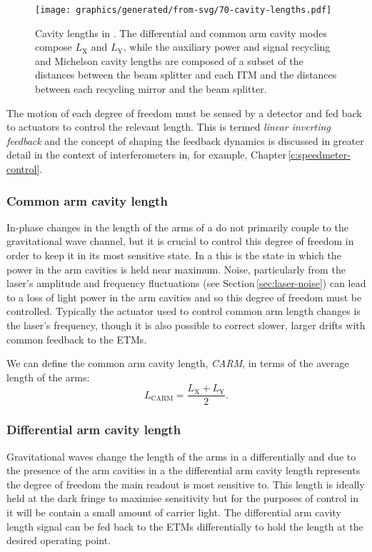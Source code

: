 \begin{figure}
  \centering
  \texttt{[image: graphics/generated/from-svg/70-cavity-lengths.pdf]}
  \caption[Cavity lengths in \ETLF{}]{\label{fig:et-lf-cavity-lengths}Cavity lengths in \ETLF{}. The differential and common arm cavity modes compose $L_{\text{X}}$ and $L_{\text{Y}}$, while the auxiliary power and signal recycling and Michelson cavity lengths are composed of a subset of the distances between the beam splitter and each \gls{ITM} and the distances between each recycling mirror and the beam splitter.}
\end{figure}

The motion of each degree of freedom must be sensed by a detector and fed back to actuators to control the relevant length. This is termed \emph{linear inverting feedback} and the concept of shaping the feedback dynamics is discussed in greater detail in the context of interferometers in, for example, Chapter\,\ref{c:speedmeter-control}.

\subsubsection{Common arm cavity length}
In-phase changes in the length of the arms of a \MI{} do not primarily couple to the gravitational wave channel, but it is crucial to control this degree of freedom in order to keep it in its most sensitive state. In a \DRFPMI{} this is the state in which the power in the arm cavities is held near maximum. Noise, particularly from the laser's amplitude and frequency fluctuations (see Section\,\ref{sec:laser-noise}) can lead to a loss of light power in the arm cavities and so this degree of freedom must be controlled. Typically the actuator used to control common arm length changes is the laser's frequency, though it is also possible to correct slower, larger drifts with common feedback to the \glspl{ETM}.

We can define the common arm cavity length, \emph{\gls{CARM}}, in terms of the average length of the arms:
\begin{equation}
  L_{\text{CARM}} = \frac{L_{\text{X}} + L_{\text{Y}}}{2}.
\end{equation}

\subsubsection{Differential arm cavity length}
Gravitational waves change the length of the arms in a \MI{} differentially and due to the presence of the arm cavities in a \DRFPMI{} the differential arm cavity length represents the degree of freedom the main readout is most sensitive to. This length is ideally held at the dark fringe to maximise sensitivity but for the purposes of control in \ETLF{} it will be contain a small amount of carrier light. The differential arm cavity length signal can be fed back to the \glspl{ETM} differentially to hold the length at the desired operating point.

